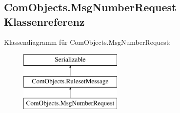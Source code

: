 \hypertarget{a00064}{\subsection{Com\-Objects.\-Msg\-Number\-Request Klassenreferenz}
\label{a00064}
}
Klassendiagramm für Com\-Objects.\-Msg\-Number\-Request\-:\begin{figure}[H]
\begin{center}
\leavevmode
\includegraphics[height=3.000000cm]{a00064}
\end{center}
\end{figure}
